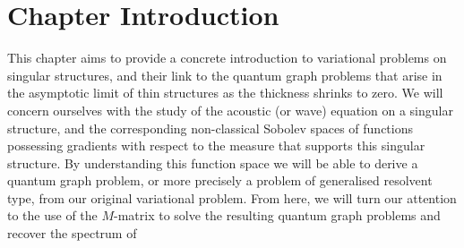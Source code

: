\section{Chapter Introduction} \label{sec:ScalarEqnChapterIntro}
This chapter aims to provide a concrete introduction to variational problems on singular structures, and their link to the quantum graph problems that arise in the asymptotic limit of thin structures as the thickness shrinks to zero.
We will concern ourselves with the study of the acoustic (or wave) equation on a singular structure, and the corresponding non-classical Sobolev spaces of functions possessing gradients with respect to the measure that supports this singular structure.
By understanding this function space we will be able to derive a quantum graph problem, or more precisely a problem of generalised resolvent type, from our original variational problem.
From here, we will turn our attention to the use of the $M$-matrix to solve the resulting quantum graph problems and recover the spectrum of 


